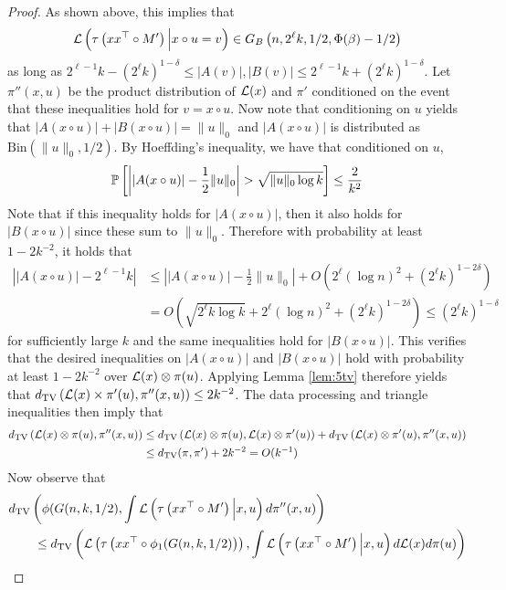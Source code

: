 \begin{proof}
As shown above, this implies that 
$$\mathcal{L}\left( \tau\left(xx^\top \circ M'\right) \Big| x \circ u = v \right) \in G_B\left(n, 2^\ell k, 1/2, \Phi(\beta) - 1/2 \right)$$
as long as $2^{\ell - 1}k - (2^\ell k)^{1 - \delta} \le |A(v)|, |B(v)| \le 2^{\ell - 1}k + (2^\ell k)^{1 - \delta}$. Let $\pi''(x, u)$ be the product distribution of $\mathcal{L}(x)$ and $\pi'$ conditioned on the event that these inequalities hold for $v = x \circ u$. Now note that conditioning on $u$ yields that $|A(x \circ u)| + |B(x \circ u)| = \| u \|_0$ and $|A(x \circ u)|$ is distributed as $\text{Bin}(\| u\|_0, 1/2)$. By Hoeffding's inequality, we have that conditioned on $u$,
$$\mathbb{P}\left[ \left| |A(x \circ u)| - \frac{1}{2} \| u \|_0 \right| > \sqrt{\| u \|_0 \log k} \right] \le \frac{2}{k^2}$$
Note that if this inequality holds for $ |A(x \circ u)|$, then it also holds for $|B(x \circ u)|$ since these sum to $\| u \|_0$. Therefore with probability at least $1 - 2k^{-2}$, it holds that
\begin{align*}
\left| |A(x \circ u)| - 2^{\ell - 1} k \right| &\le \left| |A(x \circ u)| - \frac{1}{2} \| u \|_0 \right| + O\left( 2^\ell (\log n)^2 + (2^\ell k)^{1-2\delta} \right) \\
&= O\left( \sqrt{2^\ell k \log k} + 2^\ell (\log n)^2 + (2^\ell k)^{1-2\delta} \right) \le (2^{\ell} k)^{1 - \delta}
\end{align*}
for sufficiently large $k$ and the same inequalities hold for $|B(x \circ u)|$. This verifies that the desired inequalities on $|A(x \circ u)|$ and $|B(x \circ u)|$ hold with probability at least $1 - 2k^{-2}$ over $\mathcal{L}(x) \otimes \pi(u)$. Applying Lemma \ref{lem:5tv} therefore yields that $d_{\text{TV}}\left( \mathcal{L}(x) \times \pi'(u), \pi''(x, u) \right) \le 2k^{-2}$. The data processing and triangle inequalities then imply that
\begin{align*}
d_{\text{TV}}\left( \mathcal{L}(x) \otimes \pi(u), \pi''(x, u) \right) &\le d_{\text{TV}}\left( \mathcal{L}(x) \otimes \pi(u), \mathcal{L}(x) \otimes \pi'(u) \right) + d_{\text{TV}}\left( \mathcal{L}(x) \otimes \pi'(u), \pi''(x, u) \right) \\
&\le d_{\text{TV}}( \pi, \pi') + 2k^{-2} = O(k^{-1})
\end{align*}
Now observe that
\begin{align*}
&\TV\left( \phi(G(n, k, 1/2), \int \mL\left( \tau\left(xx^\top \circ M'\right) \Big| x, u \right) d\pi''(x, u) \right) \\
&\quad \quad \le \TV\left( \mL\left( \tau\left( xx^\top \circ \phi_1(G(n, k, 1/2) \right) \right), \int \mL\left( \tau\left(xx^\top \circ M'\right) \Big| x, u \right) d\mL(x) d\pi(u) \right) \\

\end{align*}
\end{proof}
